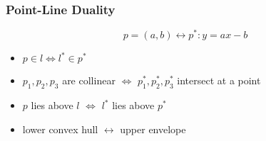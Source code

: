\subsubsection{Point-Line Duality}

\[ p=(a,b) \leftrightarrow p^*: y=ax-b \]

\begin{itemize}
    \item $p \in l \iff l^* \in p^*$
    \item $p_1, p_2, p_3$ are collinear $\iff$ $p_1^*, p_2^*, p_3^*$ intersect at a point
    \item $p$ lies above $l$ $\iff$ $l^*$ lies above $p^*$
    \item lower convex hull $\leftrightarrow$ upper envelope
\end{itemize}
